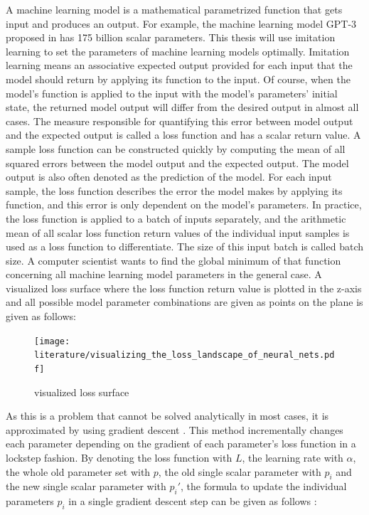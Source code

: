 \documentclass[draft,final]{vutinfth} %
\begin{document}
    A machine learning model is a mathematical parametrized function that gets input and produces an output.
    For example, the machine learning model GPT-3 proposed in \cite{GPT-3} has 175 billion scalar parameters.
    This thesis will use imitation learning to set the parameters of machine learning models optimally.
    Imitation learning means an associative expected output provided for each input that the model should return by applying its function to the input.
    Of course, when the model's function is applied to the input with the model's parameters' initial state, the returned model output will differ from the desired output in almost all cases.
    The measure responsible for quantifying this error between model output and the expected output is called a loss function and has a scalar return value.
    A sample loss function can be constructed quickly by computing the mean of all squared errors between the model output and the expected output.
    The model output is also often denoted as the prediction of the model.
    For each input sample, the loss function describes the error the model makes by applying its function, and this error is only dependent on the model's parameters.
    In practice, the loss function is applied to a batch of inputs separately, and the arithmetic mean of all scalar loss function return values of the individual input samples is used as a loss function to differentiate.
    The size of this input batch is called batch size.
    A computer scientist wants to find the global minimum of that function concerning all machine learning model parameters in the general case.
    A visualized loss surface where the loss function return value is plotted in the z-axis and all possible model parameter combinations are given as points on the plane is given as follows:
    \begin{figure}[H]
        \centering{}
        \texttt{[image: literature/visualizing\_the\_loss\_landscape\_of\_neural\_nets.pdf]}
        \caption{visualized loss surface \cite[p. 1]{loss_vis}}
        \label{fig:loss_vis}
    \end{figure}
    As this is a problem that cannot be solved analytically in most cases, it is approximated by using gradient descent \cite[p. 6-12]{GradientDescent}.
    This method incrementally changes each parameter depending on the gradient of each parameter's loss function in a lockstep fashion.
    By denoting the loss function with $L$, the learning rate with $\alpha$, the whole old parameter set with $p$, the old single scalar parameter with $p_i$ and the new single scalar parameter with $p_i'$, the formula to update the individual parameters $p_i$ in a single gradient descent step can be given as follows \cite[p. 6-12]{GradientDescent}:
\end{document}

